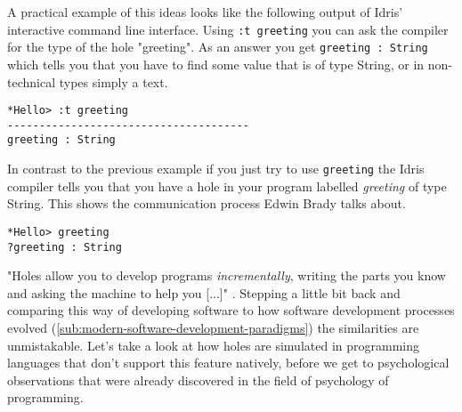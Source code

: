 A practical example of this ideas looks like the following output of Idris' interactive command line interface.
Using \verb|:t greeting| you can ask the compiler for the type of the hole "greeting".
As an answer you get \verb|greeting : String| which tells you that you have to find some value that is of type String, or in non-technical types simply a text.

\begin{verbatim}
*Hello> :t greeting
--------------------------------------
greeting : String
\end{verbatim}

In contrast to the previous example if you just try to use \verb|greeting| the Idris compiler tells you that you have a hole in your program labelled \emph{greeting} of type String.
This shows the communication process Edwin Brady talks about.

\begin{verbatim}
*Hello> greeting
?greeting : String
\end{verbatim}

"Holes allow you to develop programs \emph{incrementally}, writing the parts you know and asking the machine to help you [...]" \autocite[21]{brady_type-driven_2017}.
Stepping a little bit back and comparing this way of developing software to how software development processes evolved (\cref{sub:modern-software-development-paradigms}) the similarities are unmistakable.
Let's take a look at how holes are simulated in programming languages that don't support this feature natively, before we get to psychological observations that were already discovered in the field of psychology of programming.

